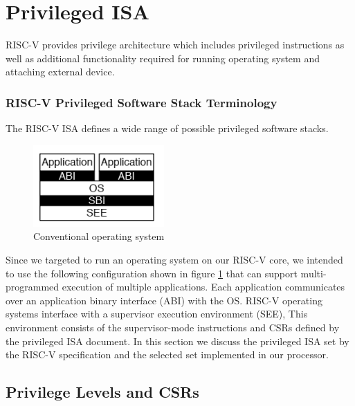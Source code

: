 \documentclass[../main.tex]{subfiles}
\begin{document}
\section{Privileged ISA}
RISC-V provides privilege architecture which includes privileged instructions as well as additional functionality required for running operating system and attaching external device.

\subsubsection{RISC-V Privileged Software Stack Terminology}
The RISC-V ISA defines a wide range of possible privileged software stacks.

\begin{figure}[h]
\centering
\includegraphics[width=5cm]{diagrams/risc_v_stack.png}
\caption{Conventional operating system}
\label{fig:software_stack}
\end{figure}

\noindent Since we targeted to run an operating system on our RISC-V core, we intended to use the following configuration shown in figure \ref{fig:software_stack} that can support multi-programmed execution of multiple applications. Each application communicates over an application binary interface (ABI) with the OS. RISC-V
operating systems interface with a supervisor execution environment (SEE), This environment consists of the supervisor-mode instructions and CSRs defined by the privileged ISA document. In this section we discuss the privileged ISA set by the RISC-V specification \cite{riscvpriv} and the selected set implemented in our processor.

\subsection{Privilege Levels and CSRs}
\end{document}
